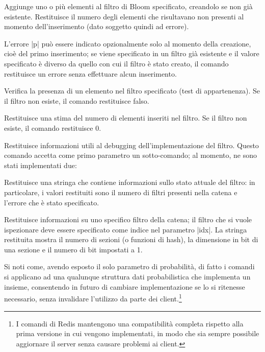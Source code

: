 \begin{description}[style=nextline,font={\bfseries\ttfamily}]
	\item[{BFADD key [ERROR p] ELEMENTS ele [ele2\dots]}] Aggiunge uno o più elementi al
	filtro di Bloom specificato, creandolo se non già esistente. Restituisce il numero degli
	elementi che risultavano non presenti al momento dell'inserimento (dato soggetto quindi ad
	errore).

	L'errore \cverb|p| può essere indicato opzionalmente solo al momento della creazione, cioè del primo
	inserimento; se viene specificato in un filtro già esistente e il valore specificato è diverso
	da quello con cui il filtro è stato creato, il comando restituisce un errore senza effettuare
	alcun inserimento.

	\item[BFEXIST key ele] Verifica la presenza di un elemento nel filtro specificato
	(test di appartenenza). Se il filtro non esiste, il comando restituisce falso.

	\item[BFCOUNT key] Restituisce una stima del numero di elementi inseriti nel filtro.
	Se il filtro non esiste, il comando restituisce $0$.

	\item[BFDEBUG] Restituisce informazioni utili al debugging dell'implementazione del
	filtro. Questo comando accetta come primo parametro un sotto-comando; al momento, ne sono stati
	implementati due:

		\begin{description}[style=nextline,font={\bfseries\ttfamily}]
		\item[BFDEBUG STATUS key] Restituisce una stringa che contiene informazioni sullo
    stato attuale del filtro: in particolare, i valori restituiti sono il numero di filtri presenti
    nella catena e l'errore che è stato specificato.

		\item[BFDEBUG FILTER key idx] Restituisce informazioni su uno specifico filtro
		della catena; il filtro che si vuole ispezionare deve essere specificato come indice 
		nel parametro \cverb|idx|. La stringa restituita mostra il numero di sezioni (o funzioni
		di hash), la dimensione in bit di una sezione e il numero di bit impostati a 1.
		\end{description}

\end{description}

Si noti come, avendo esposto il solo parametro di probabilità, di fatto i comandi si applicano ad
una qualunque struttura dati probabilistica che implementa un insieme, consentendo in futuro di
cambiare implementazione se lo si ritenesse necessario, senza invalidare l'utilizzo da parte dei
client.\footnote{I comandi di Redis mantengono una compatibilità completa rispetto alla prima
versione in cui vengono implementati, in modo che sia sempre possibile aggiornare il server senza
causare problemi ai client.}


